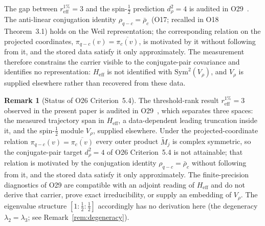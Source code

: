\documentclass[11pt,a4paper]{article}
\theoremstyle{definition}
\newtheorem{remark}[theorem]{Remark}
\begin{document}
    The gap between $r_{\mathrm{eff}}^{1\%} = 3$ and the spin-$\tfrac{1}{2}$ prediction
    $d_\rho^2 = 4$ is audited in O29~\cite{Beau2026a33}.
    The anti-linear conjugation identity $\rho_{q-c} = \bar\rho_c$ (O17; recalled in O18
    Theorem~3.1) holds on the Weil representation; the corresponding relation on the projected
    coordinates, $\pi_{q-c}(v) = \overline{\pi_c(v)}$, is motivated by it without following from it,
    and the stored data satisfy it only approximately.
    The measurement therefore constrains the carrier visible to the conjugate-pair covariance and
    identifies no representation: $H_{\mathrm{eff}}$ is not identified with
    $\mathrm{Sym}^2(V_\rho)$, and $V_\rho$ is supplied elsewhere rather than recovered from these
    data.

    \begin{remark}[Status of O26 Criterion~5.4]
      \label{rem:status}
      The threshold-rank result $r_{\mathrm{eff}}^{1\%} = 3$ observed in the present paper is audited
      in O29~\cite{Beau2026a33}, which separates three spaces: the measured trajectory span in
      $H_{\mathrm{eff}}$, a data-dependent leading truncation inside it, and the spin-$\tfrac{1}{2}$
      module $V_\rho$, supplied elsewhere.
      Under the projected-coordinate relation $\pi_{q-c}(v) = \overline{\pi_c(v)}$ every outer product
      $\widetilde{M}_j$ is complex symmetric, so the conjugate-pair target $d_\rho^2 = 4$ of O26
      Criterion~5.4 is not attainable; that relation is motivated by the conjugation identity
      $\rho_{q-c} = \bar\rho_c$ without following from it, and the stored data satisfy it only
      approximately.
      The finite-precision diagnostics of O29 are compatible with an adjoint reading of
      $H_{\mathrm{eff}}$ and do not derive that carrier, prove exact irreducibility, or supply an
      embedding of $V_\rho$.
      The eigenvalue structure $[1 : \tfrac{1}{2} : \tfrac{1}{2}]$ accordingly has no derivation here
      (the degeneracy $\lambda_2 = \lambda_3$; see Remark~\ref{rem:degeneracy}).
    \end{remark}
\end{document}
